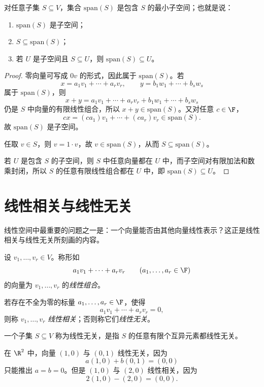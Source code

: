 \begin{proposition}
对任意子集 $S\subseteq V$，集合 $\mathrm{span}(S)$ 是包含 $S$ 的最小子空间；也就是说：
\begin{enumerate}[label=\textnormal{(\arabic*)}]
  \item $\mathrm{span}(S)$ 是子空间；
  \item $S\subseteq \mathrm{span}(S)$；
  \item 若 $U$ 是子空间且 $S\subseteq U$，则 $\mathrm{span}(S)\subseteq U$。
\end{enumerate}
\end{proposition}

\begin{proof}
零向量可写成 $0v$ 的形式，因此属于 $\mathrm{span}(S)$。若
\[
x=a_1v_1+\cdots+a_rv_r,\qquad y=b_1w_1+\cdots+b_sw_s
\]
属于 $\mathrm{span}(S)$，则
\[
x+y=a_1v_1+\cdots+a_rv_r+b_1w_1+\cdots+b_sw_s
\]
仍是 $S$ 中向量的有限线性组合，所以 $x+y\in\mathrm{span}(S)$。又对任意 $c\in\F$，
\[
cx=(ca_1)v_1+\cdots+(ca_r)v_r\in\mathrm{span}(S).
\]
故 $\mathrm{span}(S)$ 是子空间。

任取 $v\in S$，则 $v=1\cdot v$，故 $v\in\mathrm{span}(S)$，从而 $S\subseteq\mathrm{span}(S)$。

若 $U$ 是包含 $S$ 的子空间，则 $S$ 中任意向量都在 $U$ 中，而子空间对有限加法和数乘封闭，所以 $S$ 的任意有限线性组合都在 $U$ 中，即 $\mathrm{span}(S)\subseteq U$。
\end{proof}

\section{线性相关与线性无关}

线性空间中最重要的问题之一是：一个向量能否由其他向量线性表示？这正是线性相关与线性无关所刻画的内容。

\begin{definition}
设 $v_1,\dots,v_r\in V$。称形如
\[
a_1v_1+\cdots+a_rv_r\qquad (a_1,\dots,a_r\in\F)
\]
的向量为 $v_1,\dots,v_r$ 的\emph{线性组合}。

若存在不全为零的标量 $a_1,\dots,a_r\in\F$，使得
\[
a_1v_1+\cdots+a_rv_r=0,
\]
则称 $v_1,\dots,v_r$ \emph{线性相关}；否则称它们\emph{线性无关}。

一个子集 $S\subseteq V$ 称为线性无关，是指 $S$ 的任意有限个互异元素都线性无关。
\end{definition}

\begin{example}
在 $\R^2$ 中，向量 $(1,0)$ 与 $(0,1)$ 线性无关，因为
\[
a(1,0)+b(0,1)=(0,0)
\]
只能推出 $a=b=0$。但是 $(1,0)$ 与 $(2,0)$ 线性相关，因为
\[
2(1,0)-(2,0)=(0,0).
\]
\end{example}

